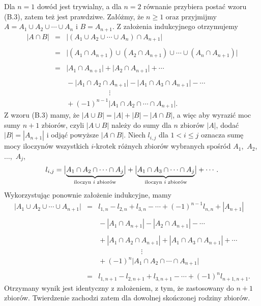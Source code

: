 Dla $n=1$ dowód jest trywialny, a dla $n=2$ równanie przybiera postać wzoru (B.3), zatem też jest prawdziwe. Załóżmy, że $n\ge 1$ oraz przyjmijmy $A=A_1\cup A_2\cup\cdots\cup A_n$ i $B=A_{n+1}$. Z założenia indukcyjnego otrzymujemy
\[
	\begin{array}{rcl}
		|A\cap B| &=& \bigl|(A_1\cup A_2\cup\cdots\cup A_n)\cap A_{n+1}\bigr| \\\\
		&=& \bigl|(A_1\cap A_{n+1})\cup(A_2\cap A_{n+1})\cup\cdots\cup(A_n\cap A_{n+1})\bigr| \\\\
		&=& \bigl|A_1\cap A_{n+1}\bigr|+\bigl|A_2\cap A_{n+1}\bigr|+\cdots \\\\
		&& {}-\bigl|A_1\cap A_2\cap A_{n+1}\bigr|-\bigl|A_1\cap A_3\cap A_{n+1}\bigr|-\cdots \\
		&& \hspace{1in}\vdots \\
		&& {}+{(-1)}^{n-1}\bigl|A_1\cap A_2\cap\cdots\cap A_{n+1}\bigr|.
	\end{array}
\]
Z wzoru (B.3) mamy, że $|A\cup B|=|A|+|B|-|A\cap B|$, a więc aby wyrazić moc sumy $n+1$ zbiorów, czyli $|A\cup B|$ należy do sumy dla $n$ zbiorów $|A|$, dodać $|B|=|A_{n+1}|$ i odjąć powyższe $|A\cap B|$. Niech $l_{i,j}$ dla $1<i\le j$ oznacza sumę mocy iloczynów wszystkich $i$-krotek różnych zbiorów wybranych spośród $A_1$,~$A_2$, $\dots$,~$A_j$,
\[
	l_{i,j} = \bigl|\underbrace{A_1\cap A_2\cap\cdots\cap A_j}_{\hbox{\scriptsize iloczyn $i$ zbiorów}}\bigr| + \bigl|\underbrace{A_1\cap A_3\cap\cdots\cap A_j}_{\hbox{\scriptsize iloczyn $i$ zbiorów}}\bigr|+\cdots.
\]
Wykorzystując ponownie założenie indukcyjne, mamy
\[
	\begin{array}{rcl}
		\bigl|A_1\cup A_2\cup\cdots\cup A_{n+1}\bigr| &=& l_{1,n}-l_{2,n}+l_{3,n}-\cdots+{(-1)}^{n-1}l_{n,n}+|A_{n+1}| \\\\
		&& {}-|A_1\cap A_{n+1}|-|A_2\cap A_{n+1}|-\cdots \\\\
		&& {}+|A_1\cap A_2\cap A_{n+1}|+|A_1\cap A_3\cap A_{n+1}|+\cdots \\
		&& \hspace{1in}\vdots \\
		&& {}+{(-1)}^n\bigl|A_1\cap A_2\cap\cdots\cap A_{n+1}\bigr| \\\\
		&=& l_{1,n+1}-l_{2,n+1}+l_{3,n+1}-\cdots+{(-1)}^nl_{n+1,n+1}.
	\end{array}
\]
Otrzymany wynik jest identyczny z założeniem, z tym, że zastosowany do $n+1$ zbiorów. Twierdzenie zachodzi zatem dla dowolnej skończonej rodziny zbiorów.

